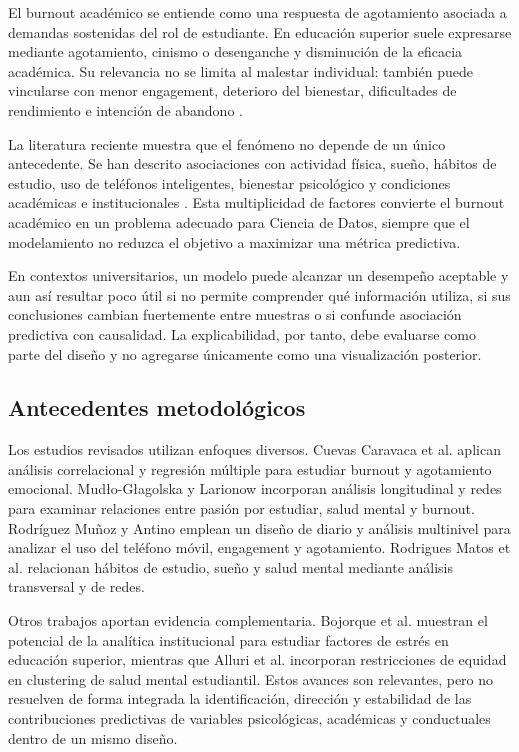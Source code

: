 \documentclass[11pt,a4paper]{article}
\begin{document}
El burnout académico se entiende como una respuesta de agotamiento asociada a demandas sostenidas del rol de estudiante. En educación superior suele expresarse mediante agotamiento, cinismo o desenganche y disminución de la eficacia académica. Su relevancia no se limita al malestar individual: también puede vincularse con menor engagement, deterioro del bienestar, dificultades de rendimiento e intención de abandono \cite{cuevas2025,mudlo2025}.

La literatura reciente muestra que el fenómeno no depende de un único antecedente. Se han descrito asociaciones con actividad física, sueño, hábitos de estudio, uso de teléfonos inteligentes, bienestar psicológico y condiciones académicas e institucionales \cite{cuevas2025,rodrigues2024,rodriguez2021,bojorque2025}. Esta multiplicidad de factores convierte el burnout académico en un problema adecuado para Ciencia de Datos, siempre que el modelamiento no reduzca el objetivo a maximizar una métrica predictiva.

En contextos universitarios, un modelo puede alcanzar un desempeño aceptable y aun así resultar poco útil si no permite comprender qué información utiliza, si sus conclusiones cambian fuertemente entre muestras o si confunde asociación predictiva con causalidad. La explicabilidad, por tanto, debe evaluarse como parte del diseño y no agregarse únicamente como una visualización posterior.

\subsection{Antecedentes metodológicos}

Los estudios revisados utilizan enfoques diversos. Cuevas Caravaca et al. \cite{cuevas2025} aplican análisis correlacional y regresión múltiple para estudiar burnout y agotamiento emocional. Mudło-Głagolska y Larionow \cite{mudlo2025} incorporan análisis longitudinal y redes para examinar relaciones entre pasión por estudiar, salud mental y burnout. Rodríguez Muñoz y Antino \cite{rodriguez2021} emplean un diseño de diario y análisis multinivel para analizar el uso del teléfono móvil, engagement y agotamiento. Rodrigues Matos et al. \cite{rodrigues2024} relacionan hábitos de estudio, sueño y salud mental mediante análisis transversal y de redes.

Otros trabajos aportan evidencia complementaria. Bojorque et al. \cite{bojorque2025} muestran el potencial de la analítica institucional para estudiar factores de estrés en educación superior, mientras que Alluri et al. \cite{alluri2026} incorporan restricciones de equidad en clustering de salud mental estudiantil. Estos avances son relevantes, pero no resuelven de forma integrada la identificación, dirección y estabilidad de las contribuciones predictivas de variables psicológicas, académicas y conductuales dentro de un mismo diseño.
\end{document}
